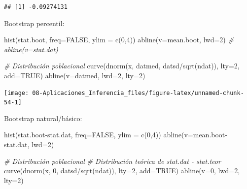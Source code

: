 \documentclass[
]{book}
\newenvironment{Shaded}{\begin{snugshade}}{\end{snugshade}}
\newcommand{\AttributeTok}[1]{\textcolor[rgb]{0.77,0.63,0.00}{#1}}
\newcommand{\CommentTok}[1]{\textcolor[rgb]{0.56,0.35,0.01}{\textit{#1}}}
\newcommand{\ConstantTok}[1]{\textcolor[rgb]{0.00,0.00,0.00}{#1}}
\newcommand{\DecValTok}[1]{\textcolor[rgb]{0.00,0.00,0.81}{#1}}
\newcommand{\FunctionTok}[1]{\textcolor[rgb]{0.00,0.00,0.00}{#1}}
\newcommand{\NormalTok}[1]{#1}
\newcommand{\SpecialCharTok}[1]{\textcolor[rgb]{0.00,0.00,0.00}{#1}}
\theoremstyle{break}
\theoremstyle{definition}
\theoremstyle{definition}
\theoremstyle{definition}
\theoremstyle{definition}
\theoremstyle{remark}
\begin{document}
\begin{verbatim}
## [1] -0.09274131
\end{verbatim}

Bootstrap percentil:

\begin{Shaded}
\begin{Highlighting}[]
\FunctionTok{hist}\NormalTok{(stat.boot, }\AttributeTok{freq=}\ConstantTok{FALSE}\NormalTok{, }\AttributeTok{ylim =} \FunctionTok{c}\NormalTok{(}\DecValTok{0}\NormalTok{,}\DecValTok{4}\NormalTok{))}
\FunctionTok{abline}\NormalTok{(}\AttributeTok{v=}\NormalTok{mean.boot, }\AttributeTok{lwd=}\DecValTok{2}\NormalTok{)}
\CommentTok{\# abline(v=stat.dat)}

\CommentTok{\# Distribución poblacional}
\FunctionTok{curve}\NormalTok{(}\FunctionTok{dnorm}\NormalTok{(x, datmed, datsd}\SpecialCharTok{/}\FunctionTok{sqrt}\NormalTok{(ndat)), }\AttributeTok{lty=}\DecValTok{2}\NormalTok{, }\AttributeTok{add=}\ConstantTok{TRUE}\NormalTok{)}
\FunctionTok{abline}\NormalTok{(}\AttributeTok{v=}\NormalTok{datmed, }\AttributeTok{lwd=}\DecValTok{2}\NormalTok{, }\AttributeTok{lty=}\DecValTok{2}\NormalTok{)}
\end{Highlighting}
\end{Shaded}

\begin{center}\texttt{[image: 08-Aplicaciones\_Inferencia\_files/figure-latex/unnamed-chunk-54-1]} \end{center}

Bootstrap natural/básico:

\begin{Shaded}
\begin{Highlighting}[]
\FunctionTok{hist}\NormalTok{(stat.boot}\SpecialCharTok{{-}}\NormalTok{stat.dat, }\AttributeTok{freq=}\ConstantTok{FALSE}\NormalTok{, }\AttributeTok{ylim =} \FunctionTok{c}\NormalTok{(}\DecValTok{0}\NormalTok{,}\DecValTok{4}\NormalTok{))}
\FunctionTok{abline}\NormalTok{(}\AttributeTok{v=}\NormalTok{mean.boot}\SpecialCharTok{{-}}\NormalTok{stat.dat, }\AttributeTok{lwd=}\DecValTok{2}\NormalTok{)}

\CommentTok{\# Distribución poblacional}
\CommentTok{\# Distribución teórica de stat.dat {-} stat.teor}
\FunctionTok{curve}\NormalTok{(}\FunctionTok{dnorm}\NormalTok{(x, }\DecValTok{0}\NormalTok{, datsd}\SpecialCharTok{/}\FunctionTok{sqrt}\NormalTok{(ndat)), }\AttributeTok{lty=}\DecValTok{2}\NormalTok{, }\AttributeTok{add=}\ConstantTok{TRUE}\NormalTok{)   }
\FunctionTok{abline}\NormalTok{(}\AttributeTok{v=}\DecValTok{0}\NormalTok{, }\AttributeTok{lwd=}\DecValTok{2}\NormalTok{, }\AttributeTok{lty=}\DecValTok{2}\NormalTok{)}
\end{Highlighting}
\end{Shaded}
\end{document}
